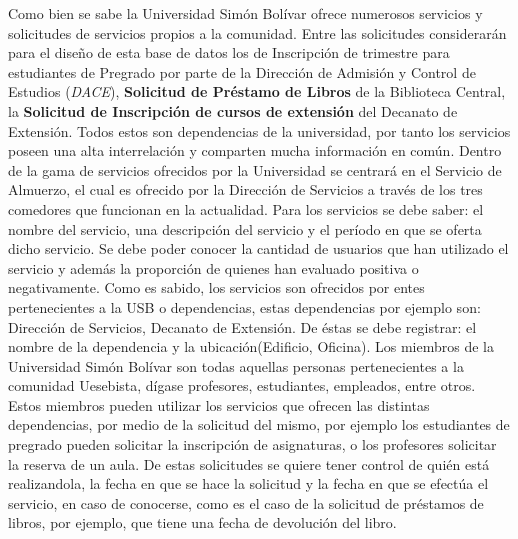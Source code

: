 \documentclass[12pt,a4paper,spanish]{article}
\begin{document}
\indent Como bien se sabe la Universidad Sim\'on Bol\'ivar ofrece
numerosos servicios y solicitudes de servicios propios a la
comunidad. Entre las solicitudes considerar\'an para el dise\~no de esta base de datos los de Inscripci\'on de trimestre para
estudiantes de Pregrado por parte de la Direcci\'on de Admisi\'on y Control de Estudios (\emph{DACE}),
\textbf {Solicitud de Pr\'estamo de Libros} de la Biblioteca
Central, la \textbf{Solicitud de Inscripci\'on de cursos de extensi\'on} del Decanato de Extensi\'on. Todos estos son dependencias
de la universidad, por tanto los servicios poseen una alta
interrelaci\'on y comparten mucha informaci\'on en com\'un. Dentro de
la gama de servicios ofrecidos por la Universidad se centrar\'a en el
Servicio de Almuerzo, el cual es ofrecido por la Direcci\'on de
Servicios a trav\'es de los tres comedores que funcionan en la actualidad.
\newline
\newline
\indent Para los servicios se debe saber: el nombre del
servicio, una descripci\'on del servicio y el per\'iodo en que se
oferta dicho servicio. Se debe poder conocer la cantidad de usuarios
que han utilizado el servicio y adem\'as la proporci\'on de quienes han evaluado positiva o negativamente.
\newline
\newline
\indent Como es sabido, los servicios son ofrecidos por entes
pertenecientes a la USB o dependencias, estas dependencias por ejemplo son: Direcci\'on de Servicios, Decanato de Extensi\'on. De \'estas se debe
registrar: el nombre de la dependencia y la ubicaci\'on(Edificio, Oficina).
\newline
\newline
\indent Los miembros de la Universidad Sim\'on Bol\'ivar son todas aquellas personas pertenecientes a la comunidad Uesebista, 
d\'igase profesores, estudiantes, empleados, entre otros. Estos miembros pueden utilizar los servicios que ofrecen las distintas dependencias, por medio de la
solicitud del mismo, por ejemplo los estudiantes de pregrado pueden solicitar la inscripci\'on de asignaturas, o los profesores solicitar la reserva de un aula. De
estas solicitudes se quiere tener control de qui\'en est\'a realizandola, la fecha en que se hace la solicitud y la fecha en que se efect\'ua el servicio, en
caso de conocerse, como es el caso de la solicitud de pr\'estamos de libros, por ejemplo, que tiene una fecha de devoluci\'on del libro.
\newline
\newline
\end{document}

